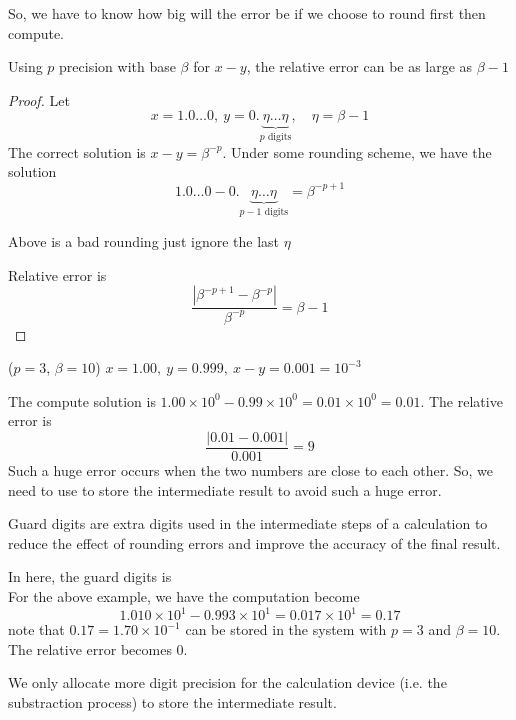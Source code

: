 So, we have to know how big will the error be if we choose to round first then compute.

\begin{theorem}
    Using $p$ precision with base $\beta$ for $x-y$, the relative error can be as large as $\beta-1$
\end{theorem}
\begin{proof}
    Let \[
        x = 1.0\ldots0, \ y= 0. \underbrace{\eta\ldots\eta}_{p \text{ digits}}, \quad \eta = \beta - 1
    \]
    The correct solution is $x-y=\beta^{-p}$.
    Under some rounding scheme, we have the solution \[
        1.0\ldots0 - 0.\underbrace{\eta\ldots\eta}_{p-1 \text{ digits}} = \beta^{-p+1}
    \]
    \begin{note}
        Above is a bad rounding just ignore the last $\eta$
    \end{note}
    Relative error is \[
        \frac{|\beta^{-p+1} - \beta^{-p}|}{\beta^{-p}} = \beta - 1
    \]
\end{proof}

\begin{eg}
    ($p=3$, $\beta=10$) $x = 1.00, \ y = 0.999, \ x-y = 0.001 = 10^{-3}$
\end{eg}
The compute solution is $1.00 \times 10^{0} - 0.99 \times 10^{0} = 0.01 \times 10^{0} = 0.01$. The relative error is \[
    \frac{|0.01 - 0.001|}{0.001} = 9
\]
Such a huge error occurs when the two numbers are close to each other. So, we need to use  to store the intermediate result to avoid such a huge error.

\begin{definition}
    Guard digits are extra digits used in the intermediate steps of a calculation to reduce the effect of rounding errors and improve the accuracy of the final result.
\end{definition}

In here, the guard digits is  \\

For the above example, we have the computation become
\[
    1.010 \times 10^{1} - 0.993 \times 10^{1} = 0.017 \times 10^{1} = 0.17
\]
note that $0.17 = 1.70 \times 10^{-1}$ can be stored in the system with $p=3$ and $\beta=10$. The relative error becomes $0$.

\begin{note}
    We only allocate more digit precision for the calculation device (i.e. the substraction process) to store the intermediate result.
\end{note}

